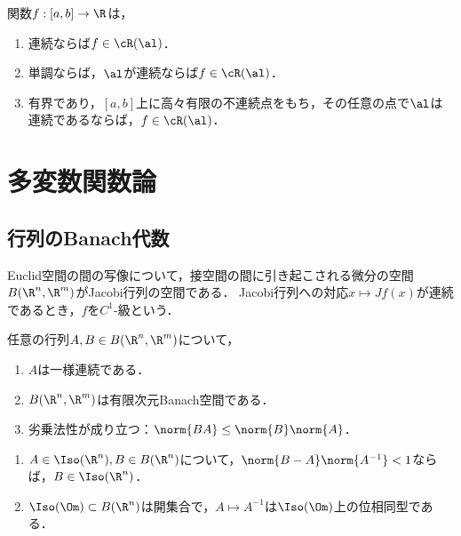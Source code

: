 \documentclass[uplatex, dvipdfmx]{jsreport}
\begin{document}
\begin{theorem}[可積分条件]\mbox{}
    関数$f:[a,b]\to\R$は，
    \begin{enumerate}
        \item 連続ならば$f\in\cR(\al)$．
        \item 単調ならば，$\al$が連続ならば$f\in\cR(\al)$．
        \item 有界であり，$[a,b]$上に高々有限の不連続点をもち，その任意の点で$\al$は連続であるならば，$f\in\cR(\al)$．
    \end{enumerate}
\end{theorem}

\chapter{多変数関数論}

\section{行列のBanach代数}

\begin{tcolorbox}[colframe=ForestGreen, colback=ForestGreen!10!white,breakable,colbacktitle=ForestGreen!40!white,coltitle=black,fonttitle=\bfseries\sffamily,
title=]
    Euclid空間の間の写像について，接空間の間に引き起こされる微分の空間$B(\R^n,\R^m)$がJacobi行列の空間である．
    Jacobi行列への対応$x\mapsto Jf(x)$が連続であるとき，$f$を$C^1$-級という．
\end{tcolorbox}

\begin{theorem}[行列の代数]
    任意の行列$A,B\in B(\R^n,\R^m)$について，
    \begin{enumerate}
        \item $A$は一様連続である．
        \item $B(\R^n,\R^m)$は有限次元Banach空間である．
        \item 劣乗法性が成り立つ：$\norm{BA}\le\norm{B}\norm{A}$．
    \end{enumerate}
\end{theorem}

\begin{theorem}[行列の空間]\mbox{}
    \begin{enumerate}
        \item $A\in\Iso(\R^n),B\in B(\R^n)$について，$\norm{B-A}\norm{A^{-1}}<1$ならば，$B\in\Iso(\R^n)$．
        \item $\Iso(\Om)\subset B(\R^n)$は開集合で，$A\mapsto A^{-1}$は$\Iso(\Om)$上の位相同型である．
    \end{enumerate}
\end{theorem}
\end{document}

